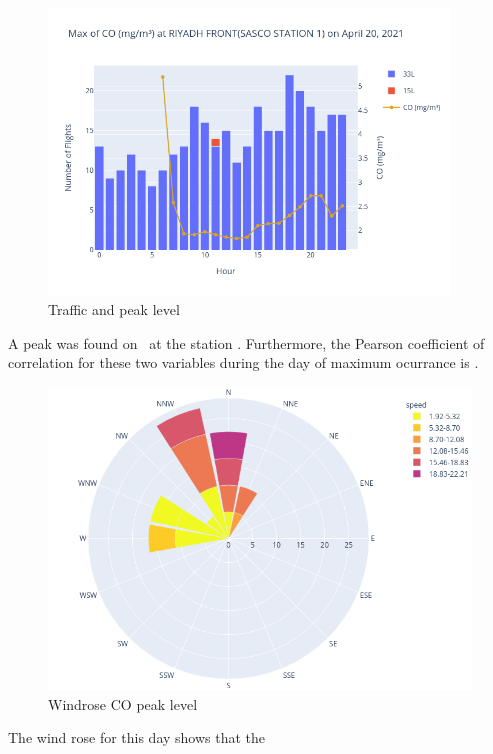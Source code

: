 \documentclass[12pt, oneside]{book}
\begin{document}
{\begin{figure}[H]
\centering
\includegraphics[width=0.95\textwidth, keepaspectratio]{image10}
\caption{Traffic and  peak level}\label{image10}
\end{figure}}{}

A  peak was found on \dayMaxCO \ at the station \stationMaxCO . %
Furthermore, the Pearson coefficient of correlation for these two variables during the day of maximum ocurrance is \correlCO .  

{\begin{figure}[H]
\centering
\includegraphics[width=.8\textwidth, keepaspectratio]{windroseCO}
\caption{Windrose CO peak level}\label{windroseCO}
\end{figure}}{}

The wind rose for this day shows that the \windCO

\section{}
\end{document}
